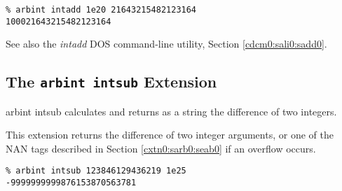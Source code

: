 \begin{tclcommandsampleinvocations}
\begin{scriptsize}
\begin{verbatim}
% arbint intadd 1e20 21643215482123164
100021643215482123164
\end{verbatim}
\end{scriptsize}
\end{tclcommandsampleinvocations}

\begin{tclcommandseealso}
See also the \emph{intadd} DOS command-line utility, 
Section \cdcmzeroxrefhyphen{}\ref{cdcm0:sali0:sadd0}.
\end{tclcommandseealso}

\subsection{The \texttt{arbint intsub} Extension}
\label{cxtn0:sarb0:ssub0}

\begin{tclcommandname}{arbint intsub}%
calculates and returns as a string the difference of two integers.
\end{tclcommandname}

\begin{tclcommandsynopsis}
\end{tclcommandsynopsis}

\begin{tclcommanddescription}
This extension returns the difference of two integer
arguments, or one of the NAN tags described in
Section \ref{cxtn0:sarb0:seab0} if an overflow occurs.
\end{tclcommanddescription}

\begin{tclcommandsampleinvocations}
\begin{scriptsize}
\begin{verbatim}
% arbint intsub 123846129436219 1e25
-9999999999876153870563781
\end{verbatim}
\end{scriptsize}
\end{tclcommandsampleinvocations}

